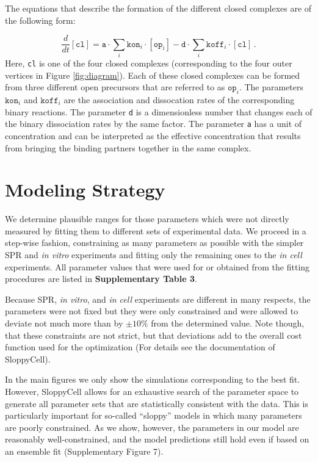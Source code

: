 \documentclass[12pt]{article}
\begin{document}
	The equations that describe the formation of the different closed
	complexes are of the following form:
	
	\begin{equation}
		\frac{d}{dt}[\texttt{cl}]=\texttt{a}\cdot\sum_{i}{\texttt{kon}_{i}}\cdot[\texttt{op}_{i}]-\texttt{d}\cdot\sum_{i}{\texttt{koff}_{i}}\cdot[\texttt{cl}]\,.
	\end{equation}
	Here, \texttt{cl} is one of the four closed complexes (corresponding
	to the four outer vertices in Figure \ref{fig:diagram}). Each of
	these closed complexes can be formed from three different open precursors that are referred to as $\texttt{op}_{i}$. The parameters $\texttt{kon}_{i}$
	and $\texttt{koff}_{i}$ are the association and dissocation rates of the corresponding binary reactions. The parameter \texttt{d} is a dimensionless number that changes each of the binary dissociation
	rates by the same factor. The parameter \texttt{a} has a unit of concentration
	and can be interpreted as the effective concentration that results
	from bringing the binding partners together in the same complex.
	
	\section{Modeling Strategy}
	We determine plausible ranges for those parameters which were not
	directly measured by fitting them to different sets of experimental
	data. We proceed in a step-wise fashion, constraining as many parameters
	as possible with the simpler SPR and \textit{in vitro} experiments
	and fitting only the remaining ones to the \textit{in cell} experiments.
	All parameter values that were used for or obtained from the fitting
	procedures are listed in \textbf{Supplementary Table 3}.
	
	Because SPR, \textit{in vitro}, and \textit{in cell} experiments are
	different in many respects, the parameters were not fixed but they
	were only constrained and were allowed to deviate not much more than
	by $\pm 10\%$ from the determined value. Note though, that these
	constraints are not strict, but that deviations add to the overall
	cost function used for the optimization (For details see the documentation
	of SloppyCell).
	
	In the main figures we only show the simulations corresponding to the best fit. However, SloppyCell allows for an exhaustive search of the parameter space to generate all parameter sets that are statistically consistent with the data. This is particularly important for so-called ``sloppy'' models in which many parameters are poorly constrained. As we show, however, the parameters in our model are reasonably well-constrained, and the model predictions still hold even if based on an ensemble fit (Supplementary Figure 7).
	
\end{document}
